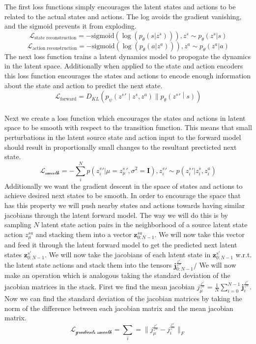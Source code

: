 \documentclass{article}
\begin{document}
The first loss functions simply encourages the latent states and actions to be related to the actual states and actions.
The log avoids the gradient vanishing, and the sigmoid prevents it from exploding.
$$\mathcal{L}_\text{state reconstruction} = -\text{sigmoid}(\log(p_\theta(s|z^s))), z^s \sim p_\theta(z^s | s)$$
$$\mathcal{L}_\text{action reconstruction} = -\text{sigmoid}(\log(p_\theta(a|z^a))), z^a \sim p_\theta(z^a | a)$$
The next loss function trains a latent dynamics model to propogate the dynamics in the latent space.
Additionally when applied to the state and action encoders this loss function encourages the states and actions to encode enough information about the state and action to predict the next state.
$$\mathcal{L}_{\text{forward}} = D_{KL}\left( p_\psi\left({z^s}'\middle|z^s,z^a\right) \parallel p_\theta\left({z^s}'\middle| s\right) \right)$$ \\
Next we create a loss function which encourages the states and actions in latent space to be smooth with respect to the transition function.
This means that small perturbations in the latent source state and action input to the forward model should result in proportionally small changes to the resultant precticted next state.
$$\mathcal{L_\text{smooth}}= -\sum\limits_i^N p({z^s_i}'|\mu={z^s_\mu}',\sigma^2=\mathbf{I}), {z^s_i}' \sim p({z^s_i}'|z^s_i,z^a_i)$$
Additionally we want the gradient descent in the space of states and actions to achieve desired next states to be smooth.
In order to encourage the space that has this property we will push nearby states and actions towards having similar jacobians through the latent forward model.
The way we will do this is by sampling \(N\) latent state action pairs in the neighborhood of a source latent state action \(z^{sa}_\mu\) and stacking them into a vector \(\mathbf{z}^{sa}_{0:N-1}\).
We will now take this vector and feed it through the latent forward model to get the predicted next latent states \(\mathbf{z}^{s'}_{0:N-1}\).
We will now take the jacobians of each latent state in \(\mathbf{z}^{s'}_{0:N-1}\) w.r.t. the latent state actions and stack them into the tensors \(\mathbf{j}^{\frac{z^{s'}}{z^{sa}}}_{0:N-1}/\)
We will now make an operation which is analogous taking the standard deviation of the jacobian matrices in the stack.
First we find the mean jacobian \(j^{\frac{z^{s'}}{z^{sa}}}_\mu = \frac{1}{N}\sum\limits_{i=0}^{N-1} \mathbf{j}^{\frac{z^{s'}}{z^{sa}}}_{i}\).
Now we can find the standard deviation of the jacobian matrices by taking the norm of the difference between each jacobian matrix and the mean jacobian matrix.
$$\mathcal{L_\text{gradients smooth}}= \sum\limits_i = \|j^{\frac{z^{s'}}{z^{sa}}}_\mu - j^{\frac{z^{s'}}{z^{sa}}}_i\|_F$$
\end{document}
